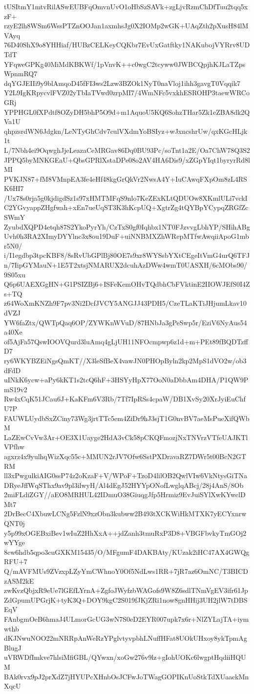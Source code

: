 tUSItmY1mtvRilASwEUBFqOmvnUvO1oHbSzSAVk+zgLjvRzmChDfTuu2tqq5xzF+
rzyE2lh8WSm6WssPTZnOOJan1axmhsJg0X2IOMp2wGK+UAqZth2pXusH84lMVAyq
76D40ShX9o8YHHiaf/HUBzCELKeyCQKbr7EvUxGatftky1NAKubojVYRrv8UDTdT
YFqweGPKg40MiMdKBKWf/1pVnvK++c0wgC2tcyww0JWBCQpjhKJLaTZpsWpnmRQ7
dqYGJEIIi9y9blAmqoD45fFI3ws2Lzw3BZOk1NyT0naVloj1ihh3gavgT0Vqqik7
Y2L9IgKRpycvlFVZ02yTbIaTVwd0zrpMI7/4WmNFc5vxkhESROHP3taewWRCoGRj
YPPHGL0fXPdtf8OZyDH5bhP5O9d+m1AquoU5KQ6SohzTHar5Zk1eZBA8dk2QVa1U
qhpzsrdWN6Jdgkn/LeNTyGhCdv7culVXdmYoBSIyz+wJxncshrUw/qxKGcHLjk1t
L/7Nbh4ei9OqwghJjeLeazaCeMRGav86Dq0BU93Pc/soTnt1a2E/Oa7ChW78Q3S2
JPPQ5byMNKGEaU+QbsGPRlXstaDPe08o2AV4HA6Dis9/xZGpYIqt1byryrRd8lMI
PVKJN87+fM8VMnpEA3fe4eHf48kgGrQkVr2NwsA4Y+IuCAwqFXpOm8zL4RSK6HI7
/Ux78s0rja5g0kjdigdSz1s97xHMTMFqS9nlo7KeZExKLtQDUOw8XKmlULi7vckI
C2YGvyappZHgfwah+xEn7ueUqST3K3hKcpUQ+XgtrZg4tQYBpYCypqZRGfZcSWmY
ZyubdXQPD4etqh87S2YkoPyrYh/CzTxS0gf0Iqhbx1NT0FJzvvgLbhYP/SHihABg
Uvh0h3RA2XImyDYYlnc3x8ou19DuF+uiNNBMXZhWRepMTfwAwqiiApoG1mbr5N0/
i/I1egdbp3tpcKBF8/8sRvUbGPlBj80OE7s9xr8WYSsbYXtCEgeItVmG4urQ6TFJ
n/7IipGYMauN+1E5T2xtsjNMARUX2dcuhAzDWw4wmT0UASXH/6cMObs90/9S05xu
Q6p6UAEXGgHN+G1PSIZBj6+ISFeKemOHvTQdbhCbFVktinE2IIOWJEfS0I4Zs+TQ
z64WoXmKNZh9F7pv3Ni2DcfJVCY5ANGJJ43PDH5/CzeTLaKTiJHjumLkav10dVZJ
YW6faZtx/QWTpQaq6OP/ZYWKnWVuD/87HNbJa3gPeSwp5r/EziV6NyAus54a40Xe
of5AjFa57QswIOOVQurd3luAmq4gLjUH11NFOcmpwp6z1d+m+PEt89fBQDTzffD7
ry6WKYBZEiNgsQmKT//X3leSfBeX4vawJN0PHOpByln2kp2MpS1dVO2w/ob3dFdD
uINkK6ycw+aPy6kKT1s2tcQ6hF+3HSYyHpX77OoN0aDbbAm4DHA/P1QW9PmS19v2
Rw4xCqK51JCau6J+KaKFm6V3Rb/7Tf7IpRSs4cpaW/DB1XvSy20XrJyiEuChfU7P
FAUWLUydbSxZCiny73Wg3jrtTTc5em4ZiDr9hJ3sjT1G0nvBV7aeMsPueXifQWbM
LaZEwCvVw3Ar+OE3X1Uayge2HdA3vCk58pCKQFmozjNxTNVrzVTfeUAJKTlVPfhw
agxrz4x9yulhqWizXqc55c+MMUN2rJV7Ofw6SstPXDravaRZ7DWr5t00BcN2GTRM
ll3xPwgulkiAIG0ssP74z2oKzaF+V/WPoF+TzoD4lilOB2QwlVIw6VkNtysGiTNa
DRyeJffWqSThx9av9pl3ilwyH/Al4dEgJ52HYYpONofLwglqABcj/28j4AnS/8Ob
2miFLdiZGY//aEO8MRHUL42IDmuO38GiuqgJfp5Hrmiz9EvJuiSYlXwKYwclDMt7
2DrBecC4XbuwLCNg5FzlN9xzObn3kubww2B493tXCKWiHkMTXK7yECYxnrwQNT0j
y5p99xOGEBxiBev1wIuZ2HhXxA++jdZanh3tmuRxP3D8+VBGFbvkyTmGOj2wYYge
8cw6hdb5qpo3cuGXKM15435/O/MFgumF4DAKBAty/KUzak2iHC47AX4GWQgRFU+7
Q/mAVFMUs9ZVzxpLZyYmCWhnoY0Of5NdLws1RR+7jR7az6OmNC/T3BICDzASM2kE
zwKvzQbjxR9eUe7lGEfLYrnA+ZgfoJWyfzbWAGofs9W8Z6sdlTNmVgEV3ifr61Jp
ZdGpumUPGrjK+tyK3Q+DOY9kgC2S019fJKjZRi1now8gnHHij3UH2jlW7tDBSEqV
FAnbgmOeB6hmaJ4ULmorGcUG3wN7S0eD2EYR007upk7x6r+NlZYLajTA+iymwthb
dKJNwuNOO22mNRRpAnWeRzYPglvtyvpbhLNuffHFat8UOkUHxoy8ykTpmAgBlugJ
uVRWDfImkve7hlsiMfiGBL/QYwxn/xoGw276v9lz+gIohUOKc6lwgptHqdiiHQUM
BAk0rvx9pJ2prXdZ7jHYUPcXHnbOsJCFwJoTWagGOPIKnUoStkTdXUaackMnXqcU
